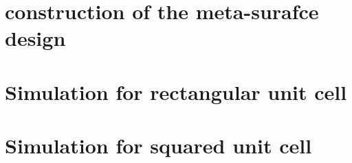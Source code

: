 \section{construction of the meta-surafce design}

\section{Simulation for rectangular unit cell}

\section{Simulation for squared unit cell}